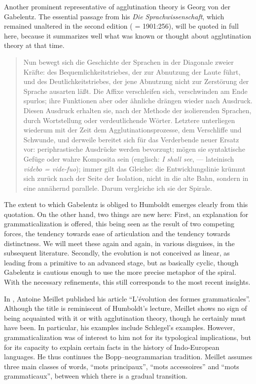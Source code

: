 Another prominent representative of agglutination theory is Georg von der Gabelentz. The essential passage from his \textit{Die Sprachwissenschaft}, which remained unaltered in the second edition (\citeyear[251]{Gabelentz1891} = 1901:256), will be quoted in full here, because it summarizes well what was known or thought about agglutination theory at that time.

\begin{quote}
	Nun bewegt sich die Geschichte der Sprachen in der Diagonale zweier Kräfte: des Bequemlichkeitstriebes, der zur Abnutzung der Laute führt, und des Deutlichkeitstriebes, der jene Abnutzung nicht zur Zerstörung der Sprache ausarten läßt. Die Affixe verschleifen sich, verschwinden am Ende spurlos; ihre Funktionen aber oder ähnliche drängen wieder nach Ausdruck. Diesen Ausdruck erhalten sie, nach der Methode der isolierenden Sprachen, durch Wortstellung oder verdeutlichende Wörter. Letztere unterliegen wiederum mit der Zeit dem Agglutinationsprozesse, dem Verschliffe und Schwunde, und derweile bereitet sich für das Verderbende neuer Ersatz vor: periphrastische Ausdrücke werden bevorzugt; mögen sie syntaktische Gefüge oder wahre Komposita sein (englisch: \textit{I shall see}, — lateinisch \textit{videbo = vide-fuo}); immer gilt das Gleiche: die Entwicklungslinie krümmt sich zurück nach der Seite der Isolation, nicht in die alte Bahn, sondern in eine annähernd parallele. Darum vergleiche ich sie der Spirale.
\end{quote}
The extent to which Gabelentz is obliged to Humboldt emerges clearly from this quotation. On the other hand, two things are new here: First, an explanation for grammaticalization is offered, this being seen as the result of two competing forces, the tendency towards ease of articulation and the tendency towards distinctness. We will meet these again and again, in various disguises, in the subsequent literature. Secondly, the evolution is not conceived as linear, as leading from a primitive to an advanced stage, but as basically cyclic, though Gabelentz is cautious enough to use the more precise metaphor of the spiral. With the necessary refinements, this still corresponds to the most recent insights.

In \citeyear{Meillet1912}, Antoine Meillet published his article “L'évolution des formes grammaticales”. Although the title is reminiscent of Humboldt's lecture, Meillet shows no sign of being acquainted with it or with agglutination theory, though he certainly must have been. In particular, his examples include Schlegel's examples. However, grammaticalization was of interest to him not for its typological implications, but for its capacity to explain certain facts in the history of Indo-European languages. He thus continues the Bopp--neogrammarian tradition. Meillet assumes three main classes of words, “mots principaux”, “mots accessoires” and “mots grammaticaux”, between which there is a gradual transition.

